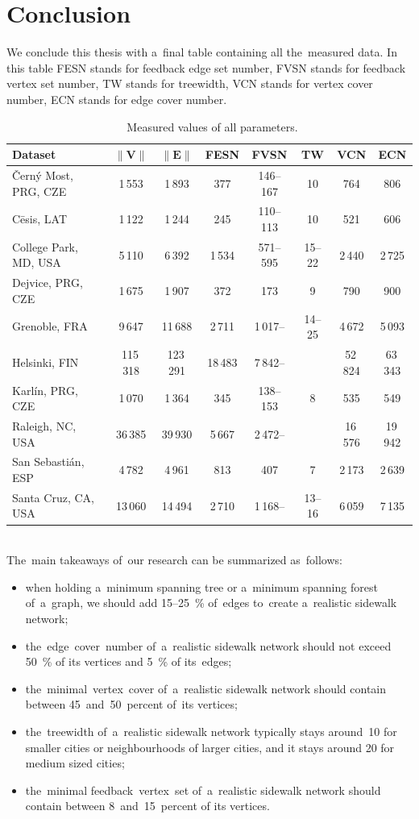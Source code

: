\chapter{Conclusion}
We conclude this thesis with a~final table containing all the~measured data. In this table FESN stands for feedback edge set number, FVSN stands for feedback vertex set number, TW stands for treewidth, VCN stands for vertex cover number, ECN stands for edge cover number.
\begin{table}[h!]
\centering
\caption[Concluding table]{~Measured values of all parameters.}\label{tab:all}
\begin{tabular}{l|c|c|c|c|c|c|c}
	\textbf{Dataset}		& $\|\mathbf{V}\|$		& $\|\mathbf{E}\|$& \textbf{FESN}   & \textbf{FVSN}    & \textbf{TW}  & \textbf{VCN}  &   \textbf{ECN} \tabularnewline \hline \hline
 	Černý Most, PRG, CZE & 1\,553	& 1\,893 & 377 & 146--167 & 10  &   764 &   806\tabularnewline \hline
 	Cēsis, LAT	& 1\,122	& 1\,244	& 245 & 110--113 & 10    &   521 &   606 \tabularnewline \hline
 	College Park, MD, USA & 5\,110 & 6\,392 & 1\,534 & 571--595	 & 15--22 &   2\,440    &   2\,725\tabularnewline \hline
 	Dejvice, PRG, CZE & 1\,675 & 1\,907 & 372 & 173	 & 9  &   790 &   900\tabularnewline \hline
 	Grenoble, FRA & 9\,647 & 11\,688 & 2\,711 & 1\,017--  & 14--25    &   4\,672  &   5\,093\tabularnewline \hline
    Helsinki, FIN & 115\,318 & 123\,291 & 18\,483 & 7\,842--    &    & 52\,824  &   63\,343\tabularnewline \hline
 	Karlín, PRG, CZE & 1\,070 & 1\,364 & 345 & 138--153 & 8   &   535 &   549\tabularnewline \hline
 	Raleigh, NC, USA & 36\,385 & 39\,930 & 5\,667 & 2\,472--	& & 16\,576  &   19\,942\tabularnewline \hline
 	San Sebastián, ESP & 4\,782 & 4\,961 & 813 & 407	 & 7 &   2\,173  &   2\,639\tabularnewline \hline
 	Santa Cruz, CA, USA & 13\,060 & 14\,494 & 2\,710 & 1\,168--   &   13--16  &   6\,059	 & 7\,135\tabularnewline
\end{tabular}
\end{table}
\\
The~main takeaways of~our research can be summarized as~follows:
\begin{itemize}
    \item when holding a~minimum spanning tree or a~minimum spanning forest of~a~graph, we should add 15--25~\% of~edges to~create a~realistic sidewalk network;
    \item the~edge~cover~number of~a~realistic sidewalk network should not exceed 50~\% of its vertices and 5~\% of its~edges;
    \item the~minimal~vertex~cover of~a~realistic sidewalk network should contain between 45~and~50~percent of~its vertices;
    \item the~treewidth of~a~realistic sidewalk network typically stays around~10 for smaller cities or neighbourhoods of larger cities, and it stays around 20 for medium sized cities;
    \item the~minimal feedback~vertex~set of~a~realistic sidewalk network should contain between 8~and~15~percent of its vertices. 
\end{itemize}
